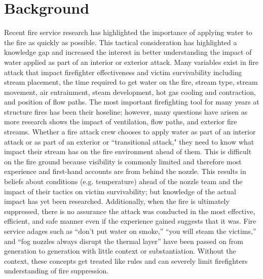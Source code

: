\documentclass{article}
\begin{document}
\newpage

\tableofcontents

\newpage

\section{Background}

Recent fire service research has highlighted the importance of applying water to the fire as quickly as possible. This tactical consideration has highlighted a knowledge gap and increased the interest in better understanding the impact of water applied as part of an interior or exterior attack. Many variables exist in fire attack that impact firefighter effectiveness and victim survivability including stream placement, the time required to get water on the fire, stream type, stream movement, air entrainment, steam development, hot gas cooling and contraction, and position of flow paths. The most important firefighting tool for many years at structure fires has been their hoseline; however, many questions have arisen as more research shows the impact of ventilation, flow paths, and exterior fire streams. Whether a fire attack crew chooses to apply water as part of an interior attack or as part of an exterior or ``transitional attack," they need to know what impact their stream has on the fire environment ahead of them. This is difficult on the fire ground because visibility is commonly limited and therefore most experience and first-hand accounts are from behind the nozzle. This results in beliefs about conditions (e.g. temperature) ahead of the nozzle team and the impact of their tactics on victim survivability; but knowledge of the actual impact has yet been researched. Additionally, when the fire is ultimately suppressed, there is no assurance the attack was conducted in the most effective, efficient, and safe manner even if the experience gained suggests that it was. Fire service adages such as ``don’t put water on smoke,'' ``you will steam the victims,'' and ``fog nozzles always disrupt the thermal layer'' have been passed on from generation to generation with little context or substantiation. Without the context, these concepts get treated like rules and can severely limit firefighters understanding of fire suppression.
\end{document}
